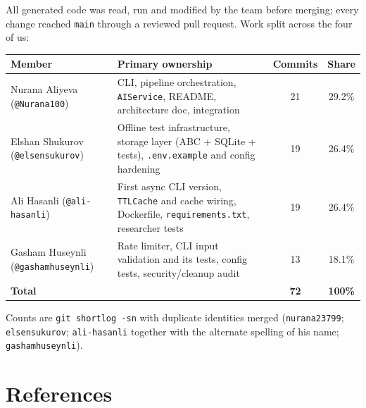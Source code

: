 \documentclass[11pt,a4paper]{article}
\begin{document}
All generated code was read, run and modified by the team before merging; every change reached
\texttt{main} through a reviewed pull request. Work split across the four of us:

\begin{center}\small
\begin{tabularx}{\textwidth}{@{}lXcc@{}}
\toprule
\textbf{Member} & \textbf{Primary ownership} & \textbf{Commits} & \textbf{Share} \\
\midrule
Nurana Aliyeva (\texttt{@Nurana100})     & CLI, pipeline orchestration, \texttt{AIService}, README, architecture doc, integration & 21 & 29.2\% \\
Elshan Shukurov (\texttt{@elsensukurov}) & Offline test infrastructure, storage layer (ABC + SQLite + tests), \texttt{.env.example} and config hardening & 19 & 26.4\% \\
Ali Hasanli (\texttt{@ali-hasanli})      & First async CLI version, \texttt{TTLCache} and cache wiring, Dockerfile, \texttt{requirements.txt}, researcher tests & 19 & 26.4\% \\
Gasham Huseynli (\texttt{@gashamhuseynli}) & Rate limiter, CLI input validation and its tests, config tests, security/cleanup audit & 13 & 18.1\% \\
\midrule
\textbf{Total} & & \textbf{72} & \textbf{100\%} \\
\bottomrule
\end{tabularx}
\end{center}

\noindent\small Counts are \texttt{git shortlog -sn} with duplicate identities merged
(\texttt{nurana23799}; \texttt{elsensukurov}; \texttt{ali-hasanli} together with the alternate
spelling of his name; \texttt{gashamhuseynli}).\normalsize

\section*{References}
\end{document}
